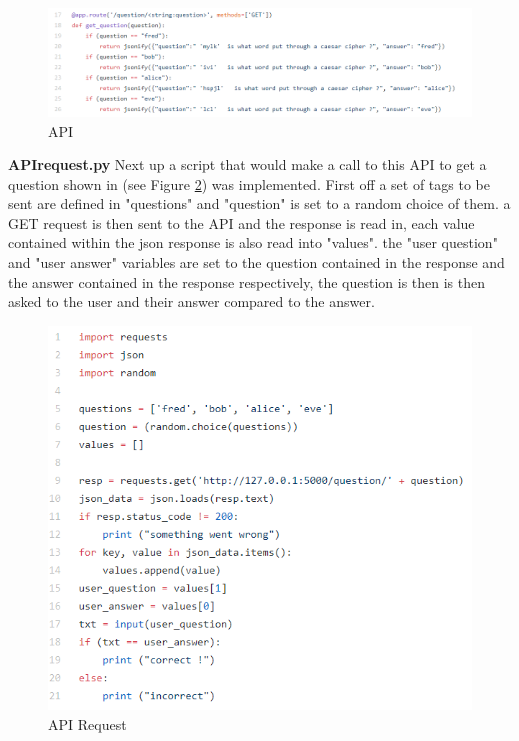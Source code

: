 \documentclass[12pt,a4paper]{article}
\begin{document}
\begin{figure}[!ht]
    \centering
    \includegraphics[width=1.0\textwidth]{Figs/API.PNG} 
    \caption{API} 
    \label{API}
\end{figure}

\textbf{API\textunderscore request.py} 
Next up a script that would make a call to this API to get a question shown in (see Figure \ref{API request}) was implemented. First off a set of tags to be sent are defined in "questions" and "question" is set to a random choice of them. a GET request is then sent to the API and the response is read in, each value contained within the json response is also read into "values". the "user question" and "user answer" variables are set to the question contained in the response and the answer contained in the response respectively, the question is then is then asked to the user and their answer compared to the answer. 

\begin{figure}[!ht]
    \centering
    \includegraphics[width=1.0\textwidth]{Figs/API request.PNG} 
    \caption{API Request} 
    \label{API request}
\end{figure}
\end{document}
